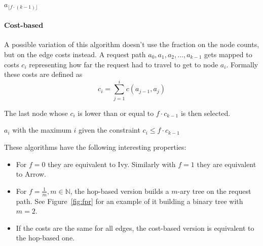 \documentclass[a4paper, oneside]{discothesis}
\begin{document}
\begin{algorithmic}
\State\Return $a_{\lfloor f\cdot(k-1)\rfloor}$
\EndFunction
\end{algorithmic}

\paragraph{Cost-based}

A possible variation of this algorithm doesn't use the fraction on the node counts, but on the edge costs instead. A request path $a_{0},a_{1},a_{2},\dots,a_{k-1}$ gets mapped to costs $c_i$ representing how far the request had to travel to get to node $a_i$. Formally these costs are defined as
\begin{equation}
c_i=\sum_{j=1}^ic(a_{j-1},a_{j})
\end{equation}

The last node whose $c_i$ is lower than or equal to $f\cdot c_{k-1}$ is then selected.

\begin{algorithmic}
\State\Return $a_{i}$ with the maximum $i$ given the constraint $c_i\leq f\cdot c_{k-1}$ 
\EndFunction
\end{algorithmic}

These algorithms have the following interesting properties:
\begin{itemize}
\item For $f=0$ they are equivalent to Ivy. Similarly with $f=1$ they are equivalent to Arrow.
\item For $f=\frac{1}{m}, m\in\mathbb{N}$, the hop-based version builds a $m$-ary tree on the request path. See Figure~\ref{fig:fpr} for an example of it building a binary tree with $m=2$.
\item If the costs are the same for all edges, the cost-based version is equivalent to the hop-based one.
\end{itemize}
\end{document}
